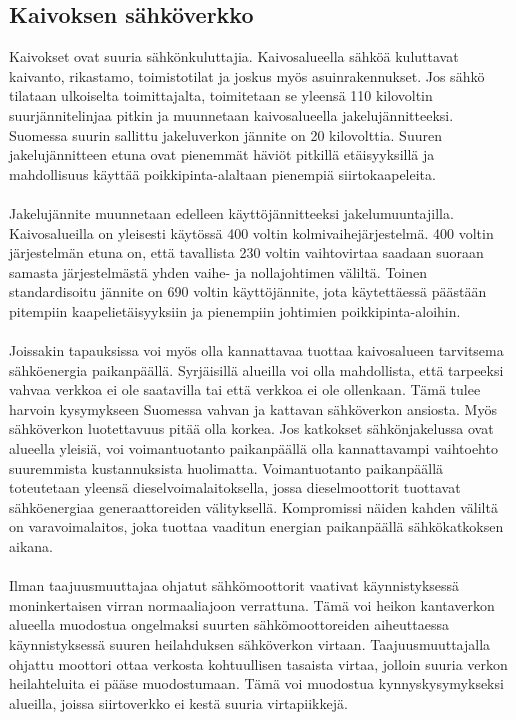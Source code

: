 \documentclass[finnish,12pt,a4paper,pdftex,elec,utf8]{aaltothesis}
\begin{document}
\subsection{Kaivoksen sähköverkko}
Kaivokset ovat suuria sähkönkuluttajia. Kaivosalueella sähköä kuluttavat kaivanto, rikastamo, toimistotilat ja joskus myös asuinrakennukset. Jos sähkö tilataan ulkoiselta toimittajalta, toimitetaan se yleensä 110 kilovoltin suurjännitelinjaa pitkin ja muunnetaan kaivosalueella jakelujännitteeksi. Suomessa suurin sallittu jakeluverkon jännite on 20 kilovolttia. Suuren jakelujännitteen etuna ovat pienemmät häviöt pitkillä etäisyyksillä ja mahdollisuus käyttää poikkipinta-alaltaan pienempiä siirtokaapeleita. \cite[s. 251-253]{Hakapää}
\\\\
Jakelujännite muunnetaan edelleen käyttöjännitteeksi jakelumuuntajilla. Kaivosalueilla on yleisesti käytössä 400 voltin kolmivaihejärjestelmä. 400 voltin järjestelmän etuna on, että tavallista 230 voltin vaihtovirtaa saadaan suoraan samasta järjestelmästä yhden vaihe- ja nollajohtimen väliltä. Toinen standardisoitu jännite on 690 voltin käyttöjännite, jota käytettäessä päästään pitempiin kaapelietäisyyksiin ja pienempiin johtimien poikkipinta-aloihin. \cite[s. 251-253]{Hakapää}
\\\\
Joissakin tapauksissa voi myös olla kannattavaa tuottaa kaivosalueen tarvitsema sähköenergia paikanpäällä. Syrjäisillä alueilla voi olla mahdollista, että tarpeeksi vahvaa verkkoa ei ole saatavilla tai että verkkoa ei ole ollenkaan. Tämä tulee harvoin kysymykseen Suomessa vahvan ja kattavan sähköverkon ansiosta. Myös sähköverkon luotettavuus pitää olla korkea. Jos katkokset sähkönjakelussa ovat alueella yleisiä, voi voimantuotanto paikanpäällä olla kannattavampi vaihtoehto suuremmista kustannuksista huolimatta. Voimantuotanto paikanpäällä toteutetaan yleensä dieselvoimalaitoksella, jossa dieselmoottorit tuottavat sähköenergiaa generaattoreiden välityksellä. Kompromissi näiden kahden väliltä on varavoimalaitos, joka tuottaa vaaditun energian paikanpäällä sähkökatkoksen aikana. \cite[s. 251-253]{Hakapää}
\\\\
Ilman taajuusmuuttajaa ohjatut sähkömoottorit vaativat käynnistyksessä moninkertaisen virran normaaliajoon verrattuna. Tämä voi heikon kantaverkon alueella muodostua ongelmaksi suurten sähkömoottoreiden aiheuttaessa käynnistyksessä suuren heilahduksen sähköverkon virtaan. Taajuusmuuttajalla ohjattu moottori ottaa verkosta kohtuullisen tasaista virtaa, jolloin suuria verkon heilahteluita ei pääse muodostumaan. Tämä voi muodostua kynnyskysymykseksi alueilla, joissa siirtoverkko ei kestä suuria virtapiikkejä. \cite{MyyntiHaastattelu}
\end{document}
